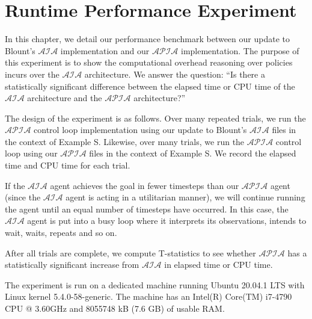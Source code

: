 \chapter{Runtime Performance Experiment}

%

In this chapter, we detail our performance benchmark between our update to Blount's $\mathcal{AIA}$ implementation and our $\mathcal{APIA}$ implementation.
The purpose of this experiment is to show the computational overhead reasoning over policies incurs over the $\mathcal{AIA}$ architecture.
We answer the question: ``Is there a statistically significant difference between the elapsed time or CPU time of the $\mathcal{AIA}$ architecture and the $\mathcal{APIA}$ architecture?''

The design of the experiment is as follows.
Over many repeated trials, we run the $\mathcal{APIA}$ control loop implementation using our update to Blount's $\mathcal{AIA}$ files in the context of Example S.
Likewise, over many trials, we run the $\mathcal{APIA}$ control loop using our $\mathcal{APIA}$ files in the context of Example S.
We record the elapsed time and CPU time for each trial.

If the $\mathcal{AIA}$ agent achieves the goal in fewer timesteps than our $\mathcal{APIA}$ agent (since the $\mathcal{AIA}$ agent is acting in a utilitarian manner), we will continue running the agent until an equal number of timesteps have occurred.
In this case, the $\mathcal{AIA}$ agent is put into a busy loop where it interprets its observations, intends to wait, waits, repeats and so on.

After all trials are complete, we compute T-statistics to see whether $\mathcal{APIA}$ has a statistically significant increase from $\mathcal{AIA}$ in elapsed time or CPU time.

The experiment is run on a dedicated machine running Ubuntu 20.04.1 LTS with Linux kernel 5.4.0-58-generic.
The machine has an Intel(R) Core(TM) i7-4790 CPU @ 3.60GHz and 8055748 kB (7.6 GB) of usable RAM.

